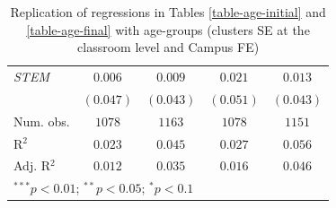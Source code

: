 \begin{table}[H]
\begin{center}
\begin{footnotesize}
\begin{tabular}{l c c c c}
\textit{STEM}         & $0.006$       & $0.009$        & $0.021$        & $0.013$        \\
                      & $(0.047)$     & $(0.043)$      & $(0.051)$      & $(0.043)$      \\
\midrule
Num. obs.             & $1078$        & $1163$         & $1078$         & $1151$         \\
R$^2$                 & $0.023$       & $0.045$        & $0.027$        & $0.056$        \\
Adj. R$^2$            & $0.012$       & $0.035$        & $0.016$        & $0.046$        \\
\bottomrule
\multicolumn{5}{l}{\footnotesize{$^{***}p<0.01$; $^{**}p<0.05$; $^{*}p<0.1$}}
\end{tabular}
\end{footnotesize}
\caption{Replication of regressions in Tables \ref{table-age-initial} and \ref{table-age-final} with age-groups (clusters SE at the classroom level and Campus FE)}
\label{table-b4-FE}
\end{center}
\end{table}

